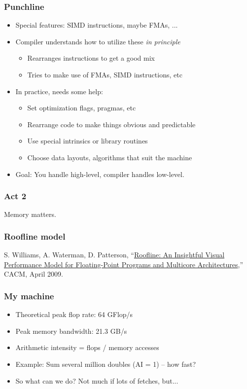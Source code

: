 \documentclass{beamer}
\begin{document}
\begin{frame}
  \frametitle{Punchline}
  
  \begin{itemize}
  \item Special features: SIMD instructions, maybe FMAs, ...
  \item Compiler understands how to utilize these {\em in principle}
    \begin{itemize}
    \item Rearranges instructions to get a good mix
    \item Tries to make use of FMAs, SIMD instructions, etc
    \end{itemize}
  \item In practice, needs some help:
    \begin{itemize}
    \item Set optimization flags, pragmas, etc
    \item Rearrange code to make things obvious and predictable
    \item Use special intrinsics or library routines
    \item Choose data layouts, algorithms that suit the machine
    \end{itemize}
  \item Goal: You handle high-level, compiler handles low-level.
  \end{itemize}
    
\end{frame}

\begin{frame}
  \frametitle{Act 2}
  Memory matters.
\end{frame}


\begin{frame}
  \frametitle{Roofline model}

  S. Williams, A. Waterman, D. Patterson,
  ``\href{http://www.eecs.berkeley.edu/Pubs/TechRpts/2008/EECS-2008-134.pdf}{Roofline:
    An Insightful Visual Performance Model for Floating-Point Programs
    and Multicore Architectures},'' CACM, April 2009.
\end{frame}


\begin{frame}
  \frametitle{My machine}

  \begin{itemize}
  \item Theoretical peak flop rate: 64 GFlop/s
  \item Peak memory bandwidth: 21.3 GB/s
  \item Arithmetic intensity = flops / memory accesses
  \item Example: Sum several million doubles (AI = 1) -- how fast?
  \item So what can we do?  Not much if lots of fetches, but...
  \end{itemize}
\end{frame}
\end{document}
